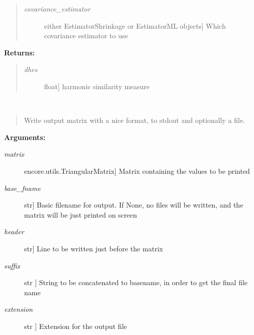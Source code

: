 \documentclass[letterpaper,10pt,english]{sphinxmanual}
\begin{document}
\begin{fulllineitems}
\begin{quote}
\begin{description}
\item[{\emph{covariance\_estimator}}] \leavevmode{[}either EstimatorShrinkage or EstimatorML objects{]}
Which covariance estimator to use

\end{description}
\end{quote}

\textbf{Returns:}
\begin{quote}
\begin{description}
\item[{\emph{dhes}}] \leavevmode{[}float{]}
harmonic similarity measure

\end{description}
\end{quote}

\end{fulllineitems}


\begin{fulllineitems}
\label{index:encore.similarity.write_output}~\begin{quote}

Write output matrix with a nice format, to stdout and optionally a file.
\end{quote}

\textbf{Arguments:}
\begin{description}
\item[{\emph{matrix}}] \leavevmode{[}encore.utils.TriangularMatrix{]}
Matrix containing the values to be printed

\item[{\emph{base\_fname}}] \leavevmode{[}str{]}
Basic filename for output. If None, no files will be written, and the matrix will be just printed on screen

\item[{\emph{header}}] \leavevmode{[}str{]}
Line to be written just before the matrix

\item[{\emph{suffix}}] \leavevmode{[}str {]}
String to be concatenated to basename, in order to get the final file name

\item[{\emph{extension}}] \leavevmode{[}str {]}
Extension for the output file

\end{description}

\end{fulllineitems}
\end{document}
